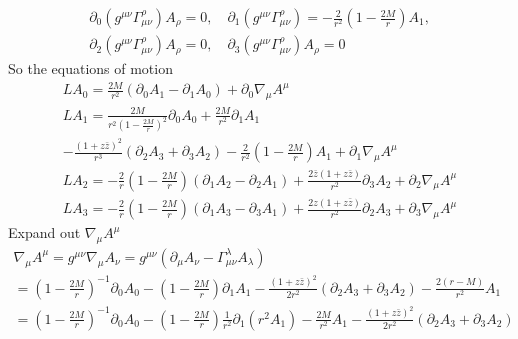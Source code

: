 \documentclass[12pt]{article}
\def\nn{\nonumber}
\begin{document}
\begin{gather}
\partial_{0}\left(g^{\mu\nu}
\Gamma^{\rho}_{\mu\nu}\right)
A_{\rho}
=
0
,
\quad
\partial_{1}\left(g^{\mu\nu}
\Gamma^{\rho}_{\mu\nu}\right)
=
- \frac{2}{r^{2}}(1 - \frac{2 M}{r}) A_{1},
\nn \\
\partial_{2}\left(g^{\mu\nu}
\Gamma^{\rho}_{\mu\nu}\right)
A_{\rho}
=
0
,
\quad
\partial_{3}\left(g^{\mu\nu}
\Gamma^{\rho}_{\mu\nu}\right)
A_{\rho}
=
0
\end{gather}
So the equations of motion
\begin{gather}
L A_{0}
=
\frac{2 M}{r^{2}}
\left(
\partial_{0}A_{1}
-
\partial_{1}A_{0}
\right)
+
\partial_{0}
\nabla_{\mu}
A^{\mu}
\label{MaxEqu1}
\\
L A_{1}
=
\frac{2 M}{r^{2} (1 - \frac{2 M}{r})^{2}} 
\partial_{0}
A_{0}
+
\frac{2 M}{r^{2}}
\partial_{1}
A_{1}
\nn \\
-
\frac{(1 + z \bar{z})^{2}}{r^{3}}
(
\partial_{2}
A_{3}
+
\partial_{3}
A_{2})
- 
\frac{2}{r^{2}}(1 - \frac{2 M}{r}) A_{1}
+
\partial_{1}
\nabla_{\mu}
A^{\mu}
\label{MaxEqu2}
\\
L A_{2}
=
-
\frac{2}{r}
(1 - \frac{2 M}{r})
(
\partial_{1}
A_{2}
-
\partial_{2}
A_{1}
)
+
\frac{2 \bar{z} (1 + z \bar{z})}{r^{2}}
\partial_{3}
A_{2}
+
\partial_{2}
\nabla_{\mu}
A^{\mu}
\label{MaxEqu3}
\\
L A_{3}
=
-
\frac{2}{r}
(1 - \frac{2 M}{r})
(
\partial_{1}
A_{3}
-
\partial_{3}
A_{1}
)
+
\frac{2 z (1 + z \bar{z})}{r^{2}}
\partial_{2}
A_{3}
+
\partial_{3}
\nabla_{\mu}
A^{\mu}
\label{MaxEqu4}
\end{gather}
Expand out $\nabla_{\mu} A^{\mu}$
\begin{gather}
\nabla_{\mu}A^{\mu}
=
g^{\mu\nu} \nabla_{\mu}A_{\nu}
=
g^{\mu\nu}
\left(
\partial_{\mu}
A_{\nu}
-
\Gamma^{\lambda}_{\mu \nu}
A_{\lambda}
\right)
\nn \\
=
(1 - \frac{2 M}{r})^{-1}
\partial_{0}
A_{0}
-
(1 - \frac{2 M}{r})
\partial_{1}
A_{1}
-
\frac{(1 + z \bar{z})^{2}}{2 r^{2}}
(\partial_{2} A_{3} + \partial_{3} A_{2})
-
\frac{2 (r - M)}{r^{2}}
A_{1}
\nn \\
=
(1 - \frac{2 M}{r})^{-1}
\partial_{0}
A_{0}
-
(1 - \frac{2 M}{r})
\frac{1}{r^{2}}
\partial_{1}
(r^{2}
A_{1})
-
\frac{2 M}{r^{2}}
A_{1}
-
\frac{(1 + z \bar{z})^{2}}{2 r^{2}}
(\partial_{2} A_{3} + \partial_{3} A_{2})
\end{gather}
\end{document}
